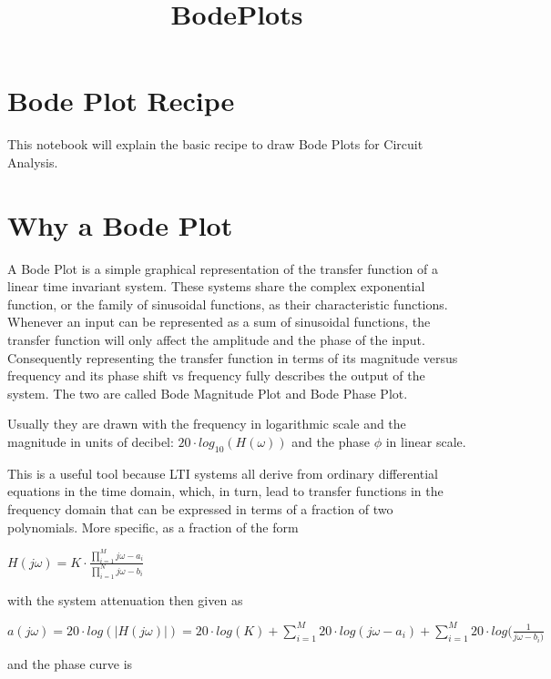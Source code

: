 \documentclass[11pt]{article}
\title{BodePlots}
\begin{document}
    
    
    \maketitle
    
    

    
    \section{Bode Plot Recipe}\label{bode-plot-recipe}

This notebook will explain the basic recipe to draw Bode Plots for
Circuit Analysis.

    \section{Why a Bode Plot}\label{why-a-bode-plot}

A Bode Plot is a simple graphical representation of the transfer
function of a linear time invariant system. These systems share the
complex exponential function, or the family of sinusoidal functions, as
their characteristic functions. Whenever an input can be represented as
a sum of sinusoidal functions, the transfer function will only affect
the amplitude and the phase of the input. Consequently representing the
transfer function in terms of its magnitude versus frequency and its
phase shift vs frequency fully describes the output of the system. The
two are called Bode Magnitude Plot and Bode Phase Plot.

Usually they are drawn with the frequency in logarithmic scale and the
magnitude in units of decibel: \(20 \cdot log_{10} (H(\omega))\) and the
phase \(\phi\) in linear scale.

This is a useful tool because LTI systems all derive from ordinary
differential equations in the time domain, which, in turn, lead to
transfer functions in the frequency domain that can be expressed in
terms of a fraction of two polynomials. More specific, as a fraction of
the form

\(H(j \omega) = K \cdot \frac{ \prod_{i=1}^{M}j\omega - a_i}{\prod_{i=1}^{N} j\omega -b_i}\)

with the system attenuation then given as

\(a(j\omega) = 20 \cdot log(|H(j\omega)|) = 20 \cdot log(K) + \sum_{i=1}^{M} 20 \cdot log(j\omega-a_i) + \sum_{i=1}^{M} 20 \cdot log(\frac{1}{ j\omega-b_i)}\)

and the phase curve is
\end{document}
